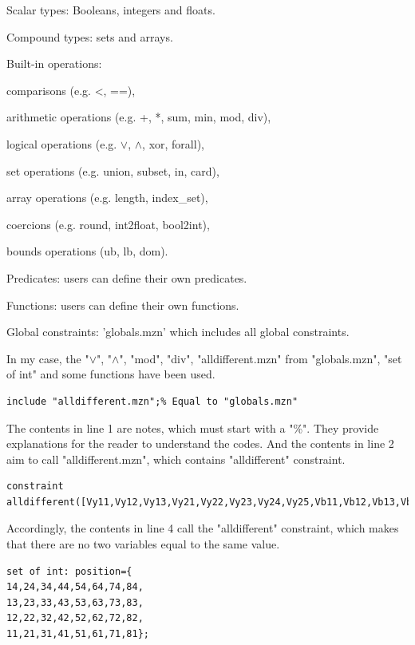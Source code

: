 \begin{compactenum}
  \item Scalar types: Booleans, integers and floats.
  \item Compound types: sets and arrays.
  \item Built-in operations: 
  \begin{compactitem}
  \item comparisons (e.g. <, ==),
  \item arithmetic operations (e.g. +, *, sum, min, mod, div),
  \item logical operations (e.g. $\vee$, $\wedge$, xor, forall),
  \item set operations (e.g. union, subset, in, card),
  \item array operations (e.g. length, index\_set),
  \item coercions (e.g. round, int2float, bool2int), 
  \item bounds operations (ub, lb, dom).
  \end{compactitem}
  \item Predicates: users can define their own predicates.
  \item Functions: users can define their own functions.
  \item Global constraints: 'globals.mzn' which includes all global constraints.
\end{compactenum}
In my case, the "$\vee$", "$\wedge$", "mod", "div", "alldifferent.mzn" from "globals.mzn", "set of int" and some functions have been used.
\begin{lstlisting}[language=minizinc,firstnumber=1]
% A simple Minizinc example 
include "alldifferent.mzn";% Equal to "globals.mzn"
\end{lstlisting}
The contents in line 1 are notes, which must start with a "\%". They provide explanations for the reader to understand the codes. And the contents in line 2 aim to call "alldifferent.mzn", which contains "alldifferent" constraint.
\begin{lstlisting}[language=minizinc,firstnumber=3]
%all the Vunits are different
constraint alldifferent([Vy11,Vy12,Vy13,Vy21,Vy22,Vy23,Vy24,Vy25,Vb11,Vb12,Vb13,Vb14,Vb15,Vb21,Vb22,Vb23,Vb24,Vg11,Vg12,Vg13,Vg14,Vg21,Vg22,Vg23,Vr11,Vr12,Vr13,Vr14,Vr21,Vr22,Vr23,Vr24]);
\end{lstlisting}
Accordingly, the contents in line 4 call the "alldifferent" constraint, which makes that there are no two variables equal to the same value. 
\begin{lstlisting}[language=minizinc,firstnumber=5]
set of int: position={
14,24,34,44,54,64,74,84,
13,23,33,43,53,63,73,83,
12,22,32,42,52,62,72,82,
11,21,31,41,51,61,71,81};
\end{lstlisting}

